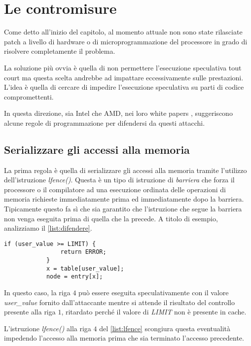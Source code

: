 	\section{Le contromisure}
		Come detto all'inizio del capitolo, al momento attuale non sono state rilasciate patch a livello di hardware o di microprogrammazione del processore in grado di risolvere completamente il problema.
		
		La soluzione più ovvia è quella di non permettere l'esecuzione speculativa tout court ma questa scelta andrebbe ad impattare eccessivamente sulle prestazioni. L'idea è quella di cercare di impedire l'esecuzione speculativa su parti di codice compromettenti.
		
		In questa direzione, sia Intel che AMD, nei loro white papers \cite{AMD2018speculation,intel2018speculative}, suggeriscono alcune regole di programmazione per difendersi da questi attacchi.
		
		\subsection*{Serializzare gli accessi alla memoria}
		
		La prima regola è quella di serializzare gli accessi alla memoria tramite l'utilizzo dell'istruzione \emph{lfence()}. Questa è un tipo di istruzione di \emph{barriera} che forza il processore o il compilatore ad una esecuzione ordinata delle operazioni di memoria richieste immediatamente prima ed immediatamente dopo la barriera. Tipicamente questo fa sì che sia garantito che l'istruzione che segue la barriera non venga eseguita prima di quella che la precede. A titolo di esempio, analizziamo il \cref{list:difendere}.
		
		\begin{lstlisting}[caption={Codice da difendere},label={list:difendere}]
			if (user_value >= LIMIT) {
				return ERROR;
			} 
			x = table[user_value]; 
			node = entry[x];
		\end{lstlisting}
		
		In questo caso, la riga $4$ può essere eseguita speculativamente con il valore \emph{user\_value} fornito dall'attaccante mentre si attende il risultato del controllo presente alla riga $1$, ritardato perché il valore di \emph{LIMIT} non è presente in cache. 
		
		L'istruzione \emph{lfence()} alla riga $4$ del \cref{list:lfence} scongiura questa eventualità impedendo l'accesso alla memoria prima che sia terminato l'accesso precedente.
		
